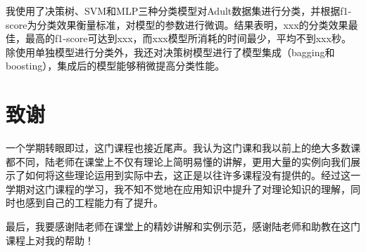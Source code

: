 \documentclass[12pt,a4paper]{article}
\theoremstyle{definition}
\begin{document}
\vspace{0.01\linewidth}
我使用了决策树、SVM和MLP三种分类模型对Adult数据集进行分类，并根据f1-score为分类效果衡量标准，对模型的参数进行微调。结果表明，xxx的分类效果最佳，最高的f1-score可达到xxx，而xxx模型所消耗的时间最少，平均不到xxx秒。除使用单独模型进行分类外，我还对决策树模型进行了模型集成（bagging和boosting），集成后的模型能够稍微提高分类性能。

\section{致谢}

一个学期转眼即过，这门课程也接近尾声。我认为这门课和我以前上的绝大多数课都不同，陆老师在课堂上不仅有理论上简明易懂的讲解，更用大量的实例向我们展示了如何将这些理论运用到实际中去，这正是以往许多课程没有提供的。经过这一学期对这门课程的学习，我不知不觉地在应用知识中提升了对理论知识的理解，同时也感到自己的工程能力有了提升。

\vspace{0.01\linewidth}
最后，我要感谢陆老师在课堂上的精妙讲解和实例示范，感谢陆老师和助教在这门课程上对我的帮助！
\end{document}
